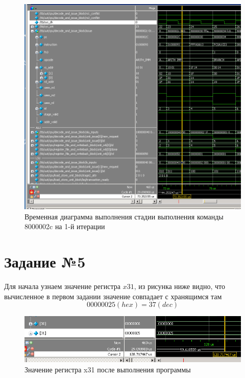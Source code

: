 \begin{figure}[h!]
	\begin{center}
		\includegraphics[scale=0.6]{assets/Task4.png}
	\end{center}
	\caption{Временная диаграмма выполнения стадии выполнения команды 8000002c на 1-й итерации}
\end{figure}

\chapter{Задание №5}

Для начала узнаем значение регистра $x31$, из рисунка ниже видно, что вычисленное в первом задании значение совпадает с хранящимся там
\begin{equation}
	00000025 (hex) = 37 (dec)
\end{equation}

\begin{figure}[h!]
	\begin{center}
		\includegraphics[scale=0.6]{assets/x31.png}
	\end{center}
	\caption{Значение регистра x31 после выполнения программы}
\end{figure}

